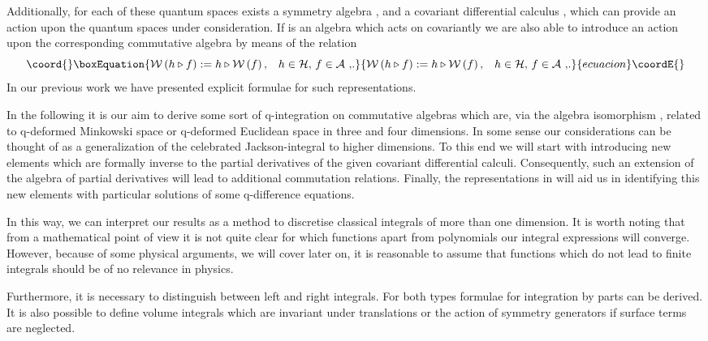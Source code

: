 \documentclass[a4paper,11pt,oneside]{article}
\providecommand{\text}[1]{\mbox{#1}}
\begin{document}
Additionally, for each of these quantum spaces exists a symmetry algebra 
\cite{Dri85}, \cite{Jim85} and a covariant differential calculus \cite{WZ91}%
, which can provide an action upon the quantum spaces under consideration.
If \coordHE{} is an algebra which acts on \coordHE{} covariantly we
are also able to introduce an action upon the corresponding
commutative algebra by means of the relation 
\begin{equation}\coord{}\boxEquation{
\mathcal{W}\left( h\triangleright f\right) :=h\triangleright \mathcal{W}
\left( f\right) \text{,\quad }h\in \mathcal{H}\text{, }f\in \mathcal{A}\text{
,}.
}{
\mathcal{W}\left( h\triangleright f\right) :=h\triangleright \mathcal{W}
\left( f\right) \text{,\quad }h\in \mathcal{H}\text{, }f\in \mathcal{A}\text{
,}.
}{ecuacion}\coordE{}\end{equation}
In our previous work \cite{BW01} we have presented explicit
formulae for such representations.

In the following it is our aim to derive some sort of q-integration on
commutative algebras which are, via the algebra isomorphism \coordHE{},
related to q-deformed Minkowski space or q-deformed Euclidean space in three
and four dimensions. In some sense our considerations can be thought of as a
generalization of the celebrated Jackson-integral \cite{Jac27} to higher
dimensions. To this end we will start with introducing new elements which
are formally inverse to the partial derivatives of the given covariant
differential calculi. Consequently, such an extension of the algebra of
partial derivatives will lead to additional commutation relations. Finally,
the representations in \cite{BW01} will aid us in identifying this new
elements with particular solutions of some q-difference equations.

In this way, we can interpret our results as a method to discretise
classical integrals of more than one dimension. It is worth noting that from
a mathematical point of view it is not quite clear for which functions
apart from polynomials our integral expressions will converge. However,
because of some physical arguments, we will cover later on, it is reasonable
to assume that functions which do not lead to finite integrals should
be of no relevance in physics.

Furthermore, it is necessary to distinguish between left and right
integrals. For both types formulae for integration by parts can be derived.
It is also possible to define volume integrals which are invariant under
translations or the action of symmetry generators if surface terms are
neglected.
\end{document}
